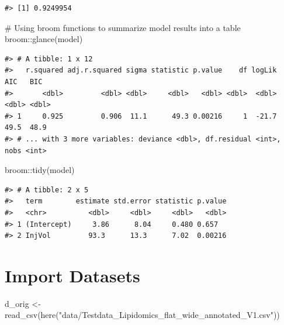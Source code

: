 \documentclass[
  letterpaper,
  DIV=11,
  numbers=noendperiod]{scrreprt}
\newenvironment{Shaded}{\begin{snugshade}}{\end{snugshade}}
\newcommand{\CommentTok}[1]{\textcolor[rgb]{0.37,0.37,0.37}{#1}}
\newcommand{\FunctionTok}[1]{\textcolor[rgb]{0.28,0.35,0.67}{#1}}
\newcommand{\NormalTok}[1]{\textcolor[rgb]{0.00,0.23,0.31}{#1}}
\newcommand{\OtherTok}[1]{\textcolor[rgb]{0.00,0.23,0.31}{#1}}
\newcommand{\SpecialCharTok}[1]{\textcolor[rgb]{0.37,0.37,0.37}{#1}}
\newcommand{\StringTok}[1]{\textcolor[rgb]{0.13,0.47,0.30}{#1}}
\begin{document}
\begin{Shaded}
\end{Shaded}

\begin{verbatim}
#> [1] 0.9249954
\end{verbatim}

\begin{Shaded}
\begin{Highlighting}[]
\CommentTok{\# Using broom functions to summarize model results into a table}
\NormalTok{broom}\SpecialCharTok{::}\FunctionTok{glance}\NormalTok{(model) }
\end{Highlighting}
\end{Shaded}

\begin{verbatim}
#> # A tibble: 1 x 12
#>   r.squared adj.r.squared sigma statistic p.value    df logLik   AIC   BIC
#>       <dbl>         <dbl> <dbl>     <dbl>   <dbl> <dbl>  <dbl> <dbl> <dbl>
#> 1     0.925         0.906  11.1      49.3 0.00216     1  -21.7  49.5  48.9
#> # ... with 3 more variables: deviance <dbl>, df.residual <int>, nobs <int>
\end{verbatim}

\begin{Shaded}
\begin{Highlighting}[]
\NormalTok{broom}\SpecialCharTok{::}\FunctionTok{tidy}\NormalTok{(model) }
\end{Highlighting}
\end{Shaded}

\begin{verbatim}
#> # A tibble: 2 x 5
#>   term        estimate std.error statistic p.value
#>   <chr>          <dbl>     <dbl>     <dbl>   <dbl>
#> 1 (Intercept)     3.86      8.04     0.480 0.657  
#> 2 InjVol         93.3      13.3      7.02  0.00216
\end{verbatim}

\hypertarget{import-datasets-1}{%
\section{Import Datasets}\label{import-datasets-1}}

\begin{Shaded}
\begin{Highlighting}[]
\NormalTok{d\_orig }\OtherTok{\textless{}{-}} \FunctionTok{read\_csv}\NormalTok{(}\FunctionTok{here}\NormalTok{(}\StringTok{"data/Testdata\_Lipidomics\_flat\_wide\_annotated\_V1.csv"}\NormalTok{))}
\end{Highlighting}
\end{Shaded}
\end{document}
